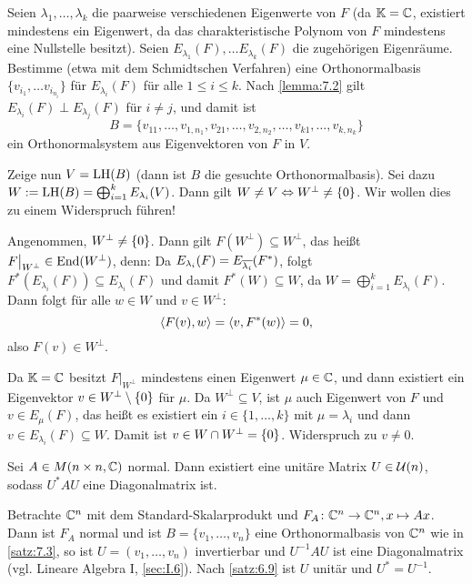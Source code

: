\begin{beweis}
	Seien $\lambda_1,\dots,\lambda_k$ die paarweise verschiedenen Eigenwerte von $F$ (da $\mathbb{K} = \mathbb{C}$, existiert mindestens ein Eigenwert, da das charakteristische Polynom von $F$ mindestens eine Nullstelle besitzt).
	Seien $E_{\lambda_1}(F), \dots E_{\lambda_k}(F)$ die zugehörigen Eigenräume.
	Bestimme (etwa mit dem Schmidtschen Verfahren) eine Orthonormalbasis $\{v_{i_1},\dots v_{i_{n_i}}\}$ für $E_{\lambda_i}(F)$ für alle $1 \leq i \leq k$.
	Nach \autoref{lemma:7.2} gilt $E_{\lambda_i}(F) \perp E_{\lambda_j}(F)$ für $i \neq j$, und damit ist
	\[
		B = \{v_{11},\dots,v_{1,n_1},v_{21},\dots,v_{2,n_2},\dots,v_{k1},\dots,v_{k,n_k}\}
	\]
	ein Orthonormalsystem aus Eigenvektoren von $F$ in $V$.
	
	Zeige nun $V = \operatorname{LH}(B)$ (dann ist $B$ die gesuchte Orthonormalbasis).
	Sei dazu $W := \operatorname{LH}(B) = \bigoplus_{i=1}^k E_{\lambda_i}(V)$.
	Dann gilt $W \neq V \Leftrightarrow W^\perp \neq \{0\}$.
	Wir wollen dies zu einem Widerspruch führen!
	
	Angenommen, $W^\perp \neq \{0\}$.
	Dann gilt $F(W^\perp) \subseteq W^\perp$, das heißt $F \big|_{W^\perp} \in \operatorname{End}(W^\perp)$, denn:
	Da $E_{\lambda_i}(F) = E_{\overline{\lambda_i}}(F^*)$, folgt $F^*(E_{\lambda_i}(F)) \subseteq E_{\lambda_i}(F)$ und damit $F^*(W) \subseteq W$, da $W = \bigoplus_{i=1}^k E_{\lambda_i}(F)$.
	Dann folgt für alle $w \in W$ und $v \in W^\perp$:
	\[
		\left\langle F(v),w\right\rangle = \left\langle v,F^*(w)\right\rangle = 0,
	\]
	also $F(v) \in W^\perp$.
	
	Da $\mathbb{K}= \mathbb{C}$ besitzt $F \big|_{W^\perp}$ mindestens einen Eigenwert $\mu \in \mathbb{C}$, und dann existiert ein Eigenvektor $v \in W^\perp \setminus \{0\}$ für $\mu$.
	Da $W^\perp \subseteq V$, ist $\mu$ auch Eigenwert von $F$ und $v \in E_\mu(F)$, das heißt es existiert ein $i \in \{1,\dots,k\}$ mit $\mu = \lambda_i$ und dann $v \in E_{\lambda_i}(F) \subseteq W$.
	Damit ist $v \in W \cap W^\perp = \{0\}$.
	Widerspruch zu $v \neq 0$. \qedhere
\end{beweis}

\begin{korollar}
	\label{kor:7.4}
	Sei $A \in M(n\times n,\mathbb{C})$ normal.
	Dann existiert eine unitäre Matrix $U \in \mathcal{U}(n)$, sodass $U^*AU$ eine Diagonalmatrix ist.
\end{korollar}

\begin{beweis}
	Betrachte $\mathbb{C}^n$ mit dem Standard-Skalarprodukt und $F_A \colon \mathbb{C}^n \rightarrow \mathbb{C}^n, x \mapsto Ax$.
	Dann ist $F_A$ normal und ist $B = \{v_1,\dots,v_n\}$ eine Orthonormalbasis von $\mathbb{C}^n$ wie in \autoref{satz:7.3}, so ist $U = (v_1,\dots,v_n)$ invertierbar und $U^{-1} A U$ ist eine Diagonalmatrix (vgl. Lineare Algebra I, \ref{sec:I.6}).
	Nach \autoref{satz:6.9} ist $U$ unitär und $U^* = U^{-1}$. \qedhere
\end{beweis}

